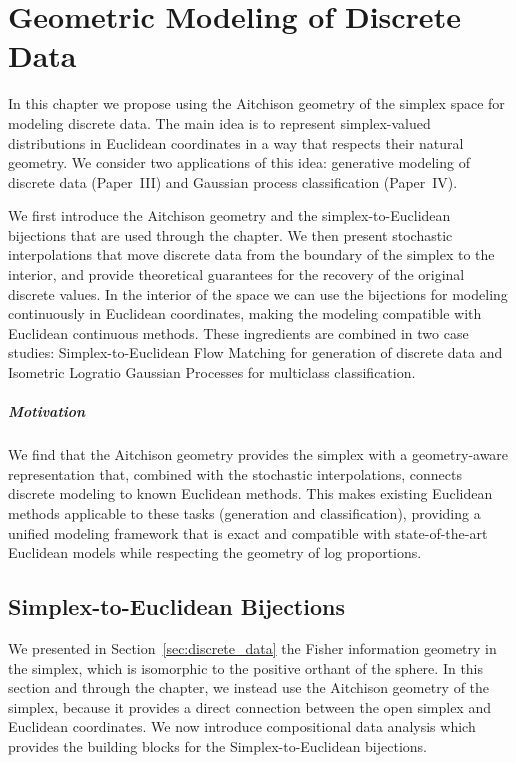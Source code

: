 \chapter{Geometric Modeling of Discrete Data} \label{ch:simplex}

In this chapter we propose using the Aitchison geometry of the simplex space for modeling discrete data. The main idea is to represent simplex-valued distributions in Euclidean coordinates in a way that respects their natural geometry. We consider two applications of this idea: generative modeling of discrete data (Paper~III) and Gaussian process classification (Paper~IV).

We first introduce the Aitchison geometry and the simplex-to-Euclidean bijections that are used through the chapter. We then present stochastic interpolations that move discrete data from the boundary of the simplex to the interior, and provide theoretical guarantees for the recovery of the original discrete values. In the interior of the space we can use the bijections for modeling continuously in Euclidean coordinates, making the modeling compatible with Euclidean continuous methods. These ingredients are combined in two case studies: Simplex-to-Euclidean Flow Matching for generation of discrete data and Isometric Logratio Gaussian Processes for multiclass classification.


\paragraph{Motivation} We find that the Aitchison geometry provides the simplex with a geometry-aware representation that, combined with the stochastic interpolations, connects discrete modeling to known Euclidean methods. This makes existing Euclidean methods applicable to these tasks (generation and classification), providing a unified modeling framework that is exact and compatible with state-of-the-art Euclidean models while respecting the geometry of log proportions.

\section{Simplex-to-Euclidean Bijections}

We presented in Section~\ref{sec:discrete_data} the Fisher information geometry in the simplex, which is isomorphic to the positive orthant of the sphere. In this section and through the chapter, we instead use the Aitchison geometry of the simplex, because it provides a direct connection between the open simplex and Euclidean coordinates. We now introduce compositional data analysis which provides the building blocks for the Simplex-to-Euclidean bijections.

